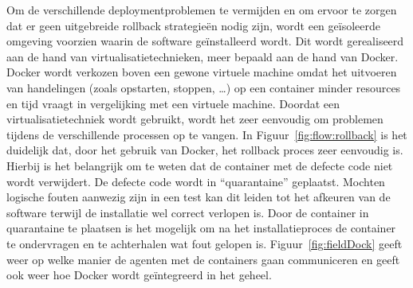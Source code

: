 Om de verschillende deploymentproblemen te vermijden en om ervoor te zorgen dat er geen uitgebreide rollback strategieën nodig zijn, wordt een geïsoleerde omgeving voorzien waarin de software geïnstalleerd wordt. 
Dit wordt gerealiseerd aan de hand van virtualisatietechnieken, meer bepaald aan de hand van Docker.
Docker wordt verkozen boven een gewone virtuele machine omdat het uitvoeren van handelingen (zoals opstarten, stoppen, \ldots) op een container minder resources en tijd vraagt in vergelijking met een virtuele machine.
Doordat een virtualisatietechniek wordt gebruikt, wordt het zeer eenvoudig om problemen tijdens de verschillende processen op te vangen.
In Figuur~\vref{fig:flow:rollback} is het duidelijk dat, door het gebruik van Docker, het rollback proces zeer eenvoudig is.
Hierbij is het belangrijk om te weten dat de container met de defecte code niet wordt verwijdert.
De defecte code wordt in ``quarantaine'' geplaatst.
Mochten logische fouten aanwezig zijn in een test kan dit leiden tot het afkeuren van de software terwijl de installatie wel correct verlopen is.
Door de container in quarantaine te plaatsen is het mogelijk om na het installatieproces de container te ondervragen en te achterhalen wat fout gelopen is.
Figuur~\vref{fig:fieldDock} geeft weer op welke manier de agenten met de containers gaan communiceren en geeft ook weer hoe Docker wordt geïntegreerd in het geheel.

